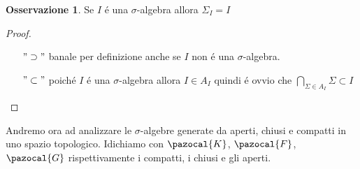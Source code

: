 \documentclass[11pt,a4paper]{report}
\theoremstyle{plain}
\theoremstyle{definition}
\newtheorem{oss}[thm]{Osservazione} %
\newcommand{\K}{\pazocal{K}}
\newcommand{\F}{\pazocal{F}}
\newcommand{\G}{\pazocal{G}}
\begin{document}
\begin{oss}
	Se $I$ \'e una $\sigma$-algebra allora $\Sigma_I = I$
	\begin{proof}
		\begin{itemize}
			\item[$"\supset"$] banale per definizione anche se $I$ non \'e una $\sigma$-algebra.
			\item[$"\subset"$] poich\'e $I$ \'e una $\sigma$-algebra allora $I \in A_I$ quindi \'e ovvio che $\bigcap\limits_{\Sigma \in A_I}\Sigma \subset I$
		\end{itemize}
	\end{proof}
\end{oss}

Andremo ora ad analizzare le $\sigma$-algebre generate da aperti, chiusi e compatti in uno spazio topologico. Idichiamo con $\K$, $\F$, $\G$ rispettivamente i compatti, i chiusi e gli aperti.
\end{document}
